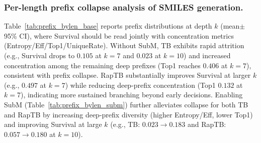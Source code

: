 \documentclass{article}
\theoremstyle{plain}
\theoremstyle{definition}
\theoremstyle{remark}
\begin{document}
\subsubsection{Per-length prefix collapse analysis of SMILES generation.}
\label{app:results_smiles_L10_prefix}
Table~\ref{tab:prefix_bylen_base} reports prefix distributions at depth $k$ (mean$\pm$95\% CI), where Survival should be read jointly with concentration metrics (Entropy/Eff/Top1/UniqueRate).
Without SubM, TB exhibits rapid attrition (e.g., Survival drops to $0.105$ at $k{=}7$ and $0.023$ at $k{=}10$) and increased concentration among the remaining deep prefixes (Top1 reaches $0.406$ at $k{=}7$), consistent with prefix collapse.
RapTB substantially improves Survival at larger $k$ (e.g., $0.497$ at $k{=}7$) while reducing deep-prefix concentration (Top1 $0.132$ at $k{=}7$), indicating more sustained branching beyond early decisions.
Enabling SubM (Table~\ref{tab:prefix_bylen_subm}) further alleviates collapse for both TB and RapTB by increasing deep-prefix diversity (higher Entropy/Eff, lower Top1) and improving Survival at large $k$ (e.g., TB: $0.023\!\to\!0.183$ and RapTB: $0.057\!\to\!0.180$ at $k{=}10$).
\end{document}
